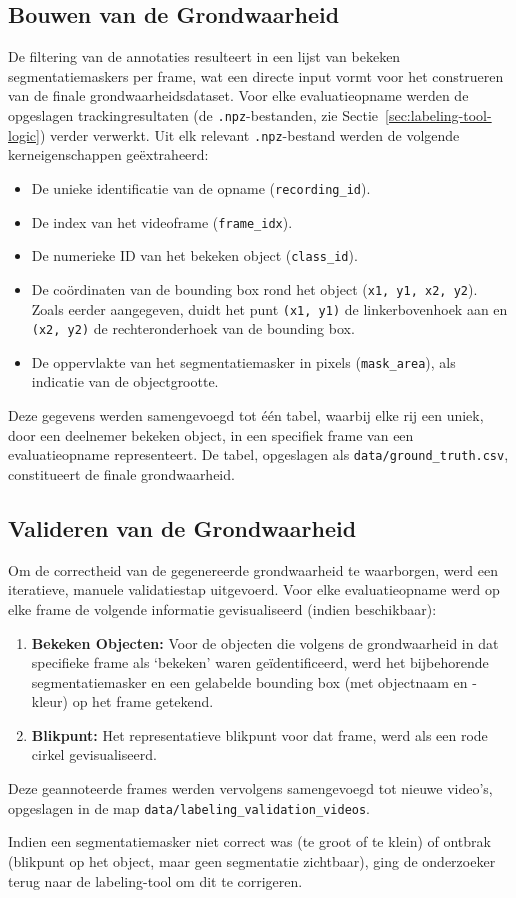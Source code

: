 \subsection{Bouwen van de Grondwaarheid}

De filtering van de annotaties resulteert in een lijst van bekeken segmentatiemaskers per frame,
wat een directe input vormt voor het construeren van de finale grondwaarheidsdataset.
Voor elke evaluatieopname werden de opgeslagen trackingresultaten 
(de \texttt{.npz}-bestanden, zie Sectie~\ref{sec:labeling-tool-logic}) verder verwerkt. 
Uit elk relevant \texttt{.npz}-bestand werden de volgende kerneigenschappen geëxtraheerd:
\begin{itemize}
  \item De unieke identificatie van de opname (\texttt{recording\_id}).
  \item De index van het videoframe (\texttt{frame\_idx}).
  \item De numerieke ID van het bekeken object (\texttt{class\_id}).
  \item De coördinaten van de bounding box rond het object (\texttt{x1, y1, x2, y2}). Zoals eerder aangegeven, duidt het punt \texttt{(x1, y1)} de linkerbovenhoek aan en \texttt{(x2, y2)} de rechteronderhoek van de bounding box.
  \item De oppervlakte van het segmentatiemasker in pixels (\texttt{mask\_area}), als indicatie van de objectgrootte.
\end{itemize}

Deze gegevens werden samengevoegd tot één tabel, waarbij elke rij een uniek, door een deelnemer bekeken object, 
in een specifiek frame van een evaluatieopname representeert. 
De tabel, opgeslagen als \texttt{data/ground\_truth.csv}, constitueert de finale grondwaarheid.

\subsection{Valideren van de Grondwaarheid}

Om de correctheid van de gegenereerde grondwaarheid te waarborgen, werd een iteratieve, manuele validatiestap uitgevoerd.
Voor elke evaluatieopname werd op elke frame de volgende informatie gevisualiseerd (indien beschikbaar):
\begin{enumerate}
  \item \textbf{Bekeken Objecten:} Voor de objecten die volgens de grondwaarheid in dat specifieke frame als `bekeken' 
  waren geïdentificeerd, werd het bijbehorende segmentatiemasker en een gelabelde bounding box (met objectnaam en -kleur) op het frame getekend.
  \item \textbf{Blikpunt:} Het representatieve blikpunt voor dat frame, werd als een rode cirkel gevisualiseerd.
\end{enumerate}
Deze geannoteerde frames werden vervolgens samengevoegd tot nieuwe video's, opgeslagen in de map \texttt{data/labeling\_validation\_videos}. 

Indien een segmentatiemasker niet correct was (te groot of te klein) of ontbrak (blikpunt op het object, maar geen segmentatie zichtbaar),
ging de onderzoeker terug naar de labeling-tool om dit te corrigeren.
